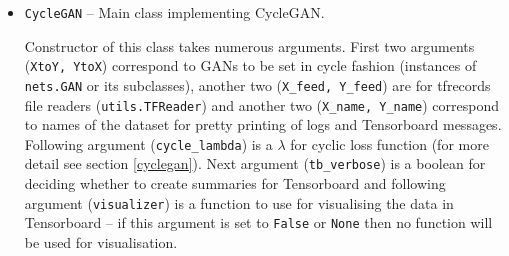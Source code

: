 \begin{itemize}
\item \texttt{CycleGAN} -- Main class implementing CycleGAN.
\begin{description}
 Constructor of this class takes numerous arguments. First two arguments (\texttt{XtoY, YtoX}) correspond to GANs to be set in cycle fashion (instances of \texttt{nets.GAN} or its subclasses), another two (\texttt{X\_feed, Y\_feed}) are for tfrecords file readers (\texttt{utils.TFReader}) and another two (\texttt{X\_name, Y\_name}) correspond to names of the dataset for pretty printing of logs and Tensorboard messages. Following argument (\texttt{cycle\_lambda}) is a $\lambda$ for cyclic loss function (for more detail see section \ref{cyclegan}). Next argument (\texttt{tb\_verbose}) is a boolean for deciding whether to create summaries for Tensorboard and following argument (\texttt{visualizer}) is a function to use for visualising the data in Tensorboard -- if this argument is set to \texttt{False} or \texttt{None} then no function will be used for visualisation.


\end{description}
\end{itemize}
